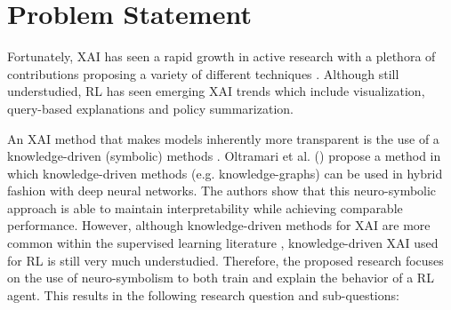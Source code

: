 \documentclass[11pt]{article}
\begin{document}
\section{Problem Statement}
Fortunately, XAI has seen a rapid growth in active research with a plethora of contributions proposing a variety of different techniques \cite{Xu2015, Ribeiro_Singh_Guestrin_2018, ijcai2019-876}. 
Although still understudied, RL has seen emerging XAI trends \cite{Wells2021} which include visualization, query-based explanations and policy summarization. 

An XAI method that makes models inherently more transparent is the use of a knowledge-driven (symbolic) methods \cite{tiddi_knowledge_2022}. Oltramari et al. (\citeyear{Oltramari2020}) propose a method in which
knowledge-driven methods (e.g. knowledge-graphs) can be used in hybrid fashion with deep neural networks. The authors show that this neuro-symbolic approach is able to maintain interpretability while achieving comparable
performance. However, although knowledge-driven methods for XAI are more common within the supervised learning literature \cite{tiddi_knowledge_2022}, knowledge-driven XAI used for RL is still very much understudied.
Therefore, the proposed research focuses on the use of neuro-symbolism to both train and explain the behavior of a RL agent. This results in the following research question and sub-questions:

\end{document}
